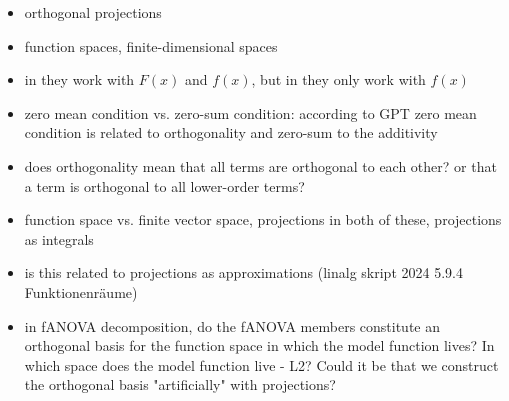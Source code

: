 \begin{itemize}
    \item orthogonal projections
    \item function spaces, finite-dimensional spaces
\end{itemize}

\begin{itemize}
    \item in \cite{hooker_discovering_2004} they work with $F(x)$ and $f(x)$, but in \cite{sobol_global_2001} they only work with $f(x)$
    \item zero mean condition vs. zero-sum condition: according to GPT zero mean condition is related to orthogonality and zero-sum to the additivity
    \item does orthogonality mean that all terms are orthogonal to each other? or that a term is orthogonal to all lower-order terms?
    \item function space vs. finite vector space, projections in both of these, projections as integrals
    \item is this related to projections as approximations (linalg skript 2024 5.9.4 Funktionenräume)
    \item in fANOVA decomposition, do the fANOVA members constitute an orthogonal basis for the function space in which the model function lives? In which space does the model function live - L2? Could it be that we construct the orthogonal basis "artificially" with projections? 
\end{itemize}









